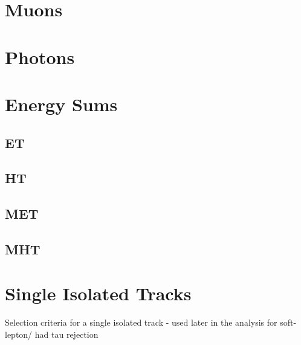 \section{Muons}  %
\label{sec:objects_muons}


\section{Photons}  %
\label{sec:objects_photons}


\section{Energy Sums}  %
\label{sec:objects_energy_sums}

\subsection{ET}
\subsection{HT}
\subsection{MET}
\subsection{MHT}

\section{Single Isolated Tracks}  %
\label{sec:objects_sit}
Selection criteria for a single isolated track - used later in the analysis for soft-lepton/
had tau rejection